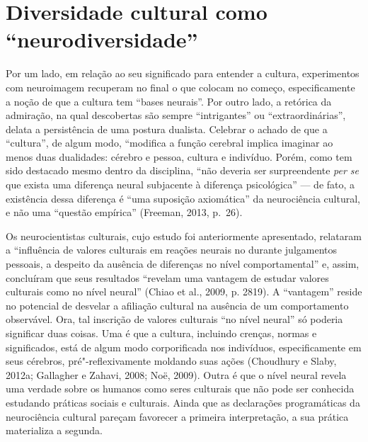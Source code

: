 \section{Diversidade cultural como ``neurodiversidade''}

Por um lado, em relação ao seu significado para entender a cultura,
experimentos com neuroimagem recuperam no final o que colocam no começo,
especificamente a noção de que a cultura tem ``bases neurais''. Por
outro lado, a retórica da admiração, na qual descobertas são sempre
``intrigantes'' ou ``extraordinárias'', delata a persistência de uma
postura dualista. Celebrar o achado de que a ``cultura'', de algum modo,
``modifica a função cerebral implica imaginar ao menos duas dualidades:
cérebro e pessoa, cultura e indivíduo. Porém, como tem sido destacado
mesmo dentro da disciplina, ``não deveria ser surpreendente \emph{per
se} que exista uma diferença neural subjacente à diferença psicológica''
--- de fato, a existência dessa diferença é ``uma suposição axiomática''
da neurociência cultural, e não uma ``questão empírica'' (Freeman, 2013,
p.~26).

Os neurocientistas culturais, cujo estudo foi anteriormente apresentado,
relataram a ``influência de valores culturais em reações neurais no 
durante julgamentos pessoais, a despeito da ausência de diferenças no
nível comportamental'' e, assim, concluíram que seus resultados
``revelam uma vantagem de estudar valores culturais como  no nível
neural'' (Chiao et al., 2009, p. 2819). A ``vantagem'' reside no
potencial de desvelar a afiliação cultural na ausência de um
comportamento observável. Ora, tal inscrição de valores culturais ``no
nível neural'' só poderia significar duas coisas. Uma é que a cultura,
incluindo crenças, normas e significados, está de algum modo
corporificada nos indivíduos, especificamente em seus cérebros,
pré"-reflexivamente moldando suas ações (Choudhury e Slaby, 2012a;
Gallagher e Zahavi, 2008; Noë, 2009). Outra é que o nível neural revela
uma verdade sobre os humanos como seres culturais que não pode ser
conhecida estudando práticas sociais e culturais. Ainda que as
declarações programáticas da neurociência cultural pareçam favorecer a
primeira interpretação, a sua prática materializa a segunda.

